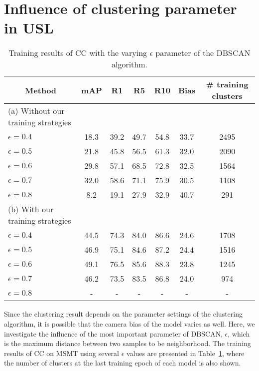 \section{Influence of clustering parameter in USL}
\label{sup:usl_clusteirng_parameter}

\begin{table}[H]
    \caption{
        Training results of CC with the varying $\epsilon$ parameter of the DBSCAN algorithm.}
    \label{tab:clustering_parameter}
    \centering
{
    \renewcommand{\arraystretch}{1.1}
    \begin{tabular}{l|cccccc}
        \hline
        \multicolumn{1}{c|}{Method} & 
        mAP & R1 & R5 & R10 & Bias & \# training clusters\\ 
        \hline \hline
        
        \multicolumn{1}{l|}{(a) Without our training strategies} \\
        $\epsilon = 0.4$    & 18.3 & 39.2 & 49.7 & 54.8 &  33.7 & 2495 \\
        $\epsilon = 0.5$    & 21.8 & 45.8 & 56.5 & 61.3 & 32.0 & 2090 \\
        $\epsilon = 0.6$    & 29.8 & 57.1 & 68.5 & 72.8 & 32.5 & 1564 \\
        $\epsilon = 0.7$    & 32.0 & 58.6 & 71.1 & 75.9 & 30.5 & 1108 \\
        $\epsilon = 0.8$    & 8.2 & 19.1 & 27.9 & 32.9 & 40.7 & 291 \\

        \hline
         \multicolumn{1}{l|}{(b) With our training strategies} \\
        $\epsilon = 0.4$    & 44.5 & 74.3 & 84.0 & 86.6 & 24.6 & 1708 \\
        $\epsilon = 0.5$    & 46.9 & 75.1 & 84.6 & 87.2 & 24.4 & 1516 \\
        $\epsilon = 0.6$    & 49.1 & 76.5 & 85.6 & 88.3 & 23.8 &  1245 \\
        $\epsilon = 0.7$    & 46.2 & 73.5 & 83.5 & 86.8 & 24.0 & 974 \\
        $\epsilon = 0.8$    & - & - & - & - & - & - \\
        
        \hline
    \end{tabular}
}
\end{table}
Since the clustering result depends on the parameter settings of the clustering algorithm, it is possible that the camera bias of the model varies as well.
Here, we investigate the influence of the most important parameter of DBSCAN, $\epsilon$, which is the maximum distance between two samples to be neighborhood.  
The training results of CC on MSMT using several $\epsilon$ values are presented in Table~\ref{tab:clustering_parameter}, where the number of clusters at the last training epoch of each model is also shown.

